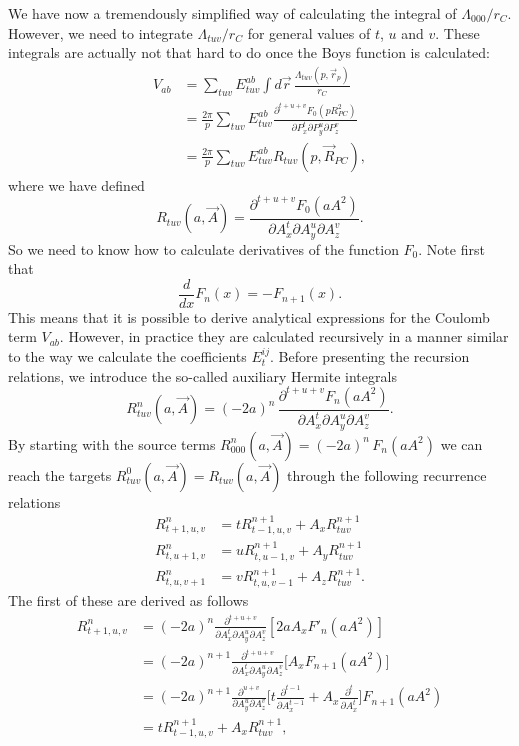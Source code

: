 We have now a tremendously simplified way of calculating the integral of $\Lambda_{000}/r_C$. However, we need to integrate $\Lambda_{tuv}/r_C$ for general values of $t$, $u$ and $v$.
These integrals are actually not that hard to do once the Boys function is calculated:
\begin{align}
 V_{ab} & = \sum_{tuv}E^{ab}_{tuv}\int d\vec r \, \frac{\Lambda_{tuv}(p,\vec r_p)}{r_C} \\
        & = \frac{2\pi}{p}\sum_{tuv}E^{ab}_{tuv} \frac{\partial^{t+u+v} F_0(p R^2_{PC})}{\partial P_x^t \partial P_y^u \partial P_z^v} \\
        & = \frac{2\pi}{p}\sum_{tuv}E^{ab}_{tuv} R_{tuv}(p,\vec R_{PC}), \label{eq:V_ab}
\end{align}
where we have defined
\begin{equation}
 R_{tuv}(a,\vec A) = \frac{\partial^{t+u+v} F_0(a A^2)}{\partial A_x^t \partial A_y^u \partial A_z^v}.
\end{equation}
So we need to know how to calculate derivatives of the function $F_0$. Note first that
\begin{equation}
 \frac{d}{dx}F_n(x) = -F_{n+1}(x).
\end{equation}
This means that it is possible to derive analytical expressions for the Coulomb term $V_{ab}$. However, in practice they are calculated recursively in a manner similar to the way we calculate
the coefficients $E^{ij}_t$. Before presenting the recursion relations, we introduce the so-called auxiliary Hermite integrals
\begin{equation}
 R^n_{tuv}(a,\vec A) = (-2a)^n\,\frac{\partial^{t+u+v} F_n(a A^2)}{\partial A_x^t \partial A_y^u \partial A_z^v}.
\end{equation}
By starting with the source terms $R^n_{000}(a,\vec A) = (-2a)^n\,F_n(a A^2)$ we can reach the targets $R^0_{tuv}(a,\vec A) = R_{tuv}(a,\vec A)$ through the following
recurrence relations
\begin{equation}
\label{eq:R_recurrence}
 \begin{split}
  R^n_{t+1,u,v} & = tR^{n+1}_{t-1,u,v} + A_x R^{n+1}_{tuv} \\
  R^n_{t,u+1,v} & = uR^{n+1}_{t,u-1,v} + A_y R^{n+1}_{tuv} \\
  R^n_{t,u,v+1} & = vR^{n+1}_{t,u,v-1} + A_z R^{n+1}_{tuv}.
 \end{split}
\end{equation}
The first of these are derived as follows
\begin{align}
 R^{n}_{t+1,u,v} & = (-2a)^n\frac{\partial^{t+u+v}}{\partial A_x^t \partial A_y^u \partial A_z^v} [2aA_xF'_n(aA^2)] \\
                 & = (-2a)^{n+1}\frac{\partial^{t+u+v}}{\partial A_x^t\partial A_y^u \partial A_z^v}\Big[A_xF_{n+1}(aA^2)\Big] \\
                 & = (-2a)^{n+1}\frac{\partial^{u+v}}{\partial A_y^u \partial A_z^v}\Big[t\frac{\partial^{t-1}}{\partial A_x^{t-1}} + A_x\frac{\partial^t}{\partial A_x^t}\Big]F_{n+1}(aA^2) \\
                 & = tR^{n+1}_{t-1,u,v} + A_xR^{n+1}_{tuv},
\end{align}
